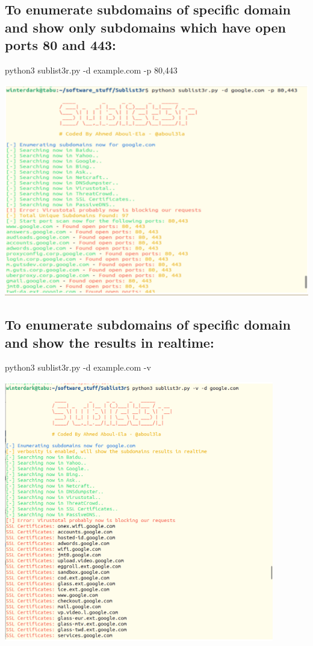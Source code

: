 \documentclass[12pt]{article}
\begin{document}
\subsection{To enumerate subdomains of specific domain and show only subdomains which have open ports 80 and 443:}\label{subsec:to-enumerate-subdomains-of-specific-domain-and-show-only-subdomains-which-have-open-ports-80-and-443}
python3 sublist3r.py -d example.com -p 80,443

\begin{center}
    \includegraphics[max width=\textwidth]{Image2.png}
\end{center}

\subsection{To enumerate subdomains of specific domain and show the results in realtime:}\label{subsec:to-enumerate-subdomains-of-specific-domain-and-show-the-results-in-realtime}
python3 sublist3r.py -d example.com -v

\begin{center}
    \includegraphics[max width=\textwidth]{Image3.png}
\end{center}
\end{document}
